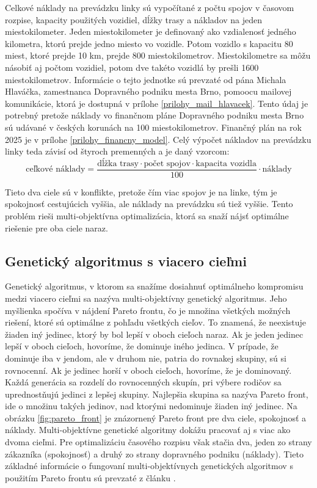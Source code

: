 Celkové náklady na prevádzku linky sú vypočítané z počtu spojov v časovom rozpise, kapacity použitých vozidiel, dĺžky trasy a nákladov na jeden miestokilometer.
Jeden miestokilometer je definovaný ako vzdialenosť jedného kilometra, ktorú prejde jedno miesto vo vozidle.
Potom vozidlo s kapacitu 80 miest, ktoré prejde 10 km, prejde 800 miestokilometrov.
Miestokilometre sa môžu násobiť aj počtom vozidiel, potom dve takéto vozidlá by prešli 1600 miestokilometrov.
Informácie o tejto jednotke sú prevzaté od pána Michala Hlaváčka, zamestnanca Dopravného podniku mesta Brno, pomoocu mailovej komunikácie, ktorá je dostupná v prílohe \ref{prilohy_mail_hlavacek}.
Tento údaj je potrebný pretože náklady vo finančnom pláne Dopravného podniku mesta Brno sú udávané v českých korunách na 100 miestokilometrov.
Finančný plán na rok 2025 je v prílohe \ref{prilohy_financny_model}.
Celý výpočet nákladov na prevádzku linky teda závisí od štyroch premenných a je daný vzorcom:
\begin{equation}
  \text{ceľkové náklady} = \frac{\text{dĺžka trasy} \cdot \text{počet spojov} \cdot \text{kapacita vozidla}}{100} \cdot \text{náklady}
\end{equation}

Tieto dva ciele sú v konflikte, pretože čím viac spojov je na linke, tým je spokojnosť cestujúcich vyššia, ale náklady na prevádzku sú tiež vyššie.
Tento problém rieši multi-objektívna optimalizácia, ktorá sa snaží nájsť optimálne riešenie pre oba ciele naraz.

\subsection*{Genetický algoritmus s viacero cieľmi}
Genetický algoritmus, v ktorom sa snažíme dosiahnuť optimálneho kompromisu medzi viacero cieľmi sa nazýva multi-objektívny genetický algoritmus.
Jeho myšlienka spočíva v nájdení Pareto frontu, čo je množina všetkých možných riešení, ktoré sú optimálne z pohľadu všetkých cieľov.
To znamená, že neexistuje žiaden iný jedinec, ktorý by bol lepší v oboch cieľoch naraz.
Ak je jeden jedinec lepší v oboch cieľoch, hovoríme, že dominuje iného jedinca.
V prípade, že dominuje iba v jendom, ale v druhom nie, patria do rovnakej skupiny, sú si rovnocenní.
Ak je jedinec horší v oboch cieľoch, hovoríme, že je dominovaný.
Každá generácia sa rozdelí do rovnocenných skupín, pri výbere rodičov sa uprednostňujú jedinci z lepšej skupiny.
Najlepšia skupina sa nazýva Pareto front, ide o množinu takých jedinov, nad ktorými nedominuje žiaden iný jedinec.
Na obrázku \ref{fig:pareto_front} je znázornený Pareto front pre dva ciele, spokojnosť a náklady.
Multi-objektívne genetické algoritmy dokážu pracovať aj s viac ako dvoma cieľmi.
Pre optimalizáciu časového rozpisu však stačia dva, jeden zo strany zákazníka (spokojnosť) a druhý zo strany dopravného podniku (náklady).
Tieto základné informácie o fungovaní multi-objektívnych genetických algoritmov s použitím Pareto frontu sú prevzaté z článku \cite{1599245}.

